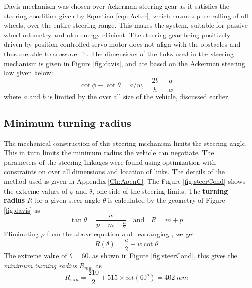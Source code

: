Davis mechanism was chosen over Ackerman steering gear as it satisfies the steering condition given by  Equation \ref{eqn:Acker}, which ensures pure rolling of all  wheels, over the entire steering range. This makes the system, suitable for passive wheel odometry and also energy efficient.  The steering gear being positively driven by position controlled servo motor does not align with the obstacles and thus are able to crossover it. The dimensions of the links used in the steering mechanism is given in Figure \ref{fig:davis}, and are based on the Ackerman steering law given below:
\begin{equation}
\label{eqn:Acker}
\cot\phi-\cot\theta=a/w, \quad  \frac{2b}{h}=\frac{a}{w}
\end{equation}
where $a$ and $b$ is limited by the over all size of the vehicle, discussed earlier.

\subsection{Minimum turning radius}
The mechanical construction of this steering mechanism limits the steering angle. This in turn limits the minimum radius the vehicle can negotiate. The parameters of the steering linkages were found using  optimization with constraints on over all dimensions and location  of links. The details of the method used is given in Appendix \ref{Ch:ApenC}. The
Figure \ref{fig:steerCond} shows the extreme values of $\phi$ and $ \theta$, one side of the steering limits. The \textbf{ turning radius } $R$ for a given steer angle $\theta$  is calculated  by the geometry of Figure  \ref{fig:davis} as
\begin{equation*}
\tan\theta =\frac{w}{p+m-\frac{a}{2}} \quad \text{and} \quad R=m+p
\end{equation*}
Eliminating $p$  from the above equation and rearranging , we get 
\begin{equation}
\label{eqn:turningRadius}
R(\theta)=\frac{a}{2}+w\cot\theta
\end{equation}
The extreme value of $\theta=60.$ as shown in Figure \ref{fig:steerCond}, this gives the \textit{minimum turning radius } $R_{min}$ as
\begin{equation*}
R_{min}=\frac{210}{2}+515 \times cot(60^o)=402~mm
\end{equation*}

